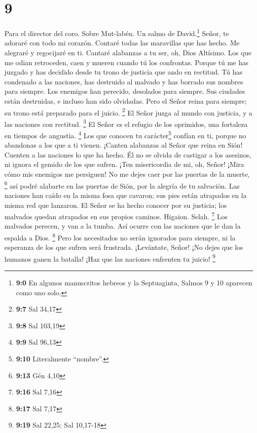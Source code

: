 \hypertarget{section-8}{%
\section{9}\label{section-8}}

Para el director del coro. Sobre Mut-labén. Un salmo de
David.\footnote{\textbf{9:0} En algunos manuscritos hebreos y la
  Septuaginta, Salmos 9 y 10 aparecen como uno solo.} 
Señor, te adoraré con todo mi corazón. Contaré todas las maravillas que
has hecho.  Me alegraré y regocijaré en ti. Cantaré
alabanzas a tu ser, oh, Dios Altísimo.  Los que me odian
retroceden, caen y mueren cuando tú los confrontas. 
Porque tú me has juzgado y has decidido desde tu trono de justicia que
ando en rectitud.  Tú has condenado a las naciones, has
destruido al malvado y has borrado sus nombres para siempre.
 Los enemigos han perecido, desolados para siempre. Sus
ciudades están destruidas, e incluso han sido olvidadas. 
Pero el Señor reina para siempre; su trono está preparado para el
juicio. \footnote{\textbf{9:7} Sal 34,17}  El Señor juzga
al mundo con justicia, y a las naciones con rectitud. \footnote{\textbf{9:8}
  Sal 103,19}  El Señor es el refugio de los oprimidos,
una fortaleza en tiempos de angustia. \footnote{\textbf{9:9} Sal 96,13}
 Los que conocen tu carácter\footnote{\textbf{9:10}
  Literalmente ``nombre''.} confían en ti, porque no abandonas a los que
a ti vienen.  ¡Canten alabanzas al Señor que reina en
Sión! Cuenten a las naciones lo que ha hecho.  Él no se
olvida de castigar a los asesinos, ni ignora el gemido de los que
sufren.  ¡Ten misericordia de mi, oh, Señor! ¡Mira cómo
mis enemigos me persiguen! No me dejes caer por las puertas de la
muerte, \footnote{\textbf{9:13} Gén 4,10}  así podré
alabarte en las puertas de Sión, por la alegría de tu salvación.
 Las naciones han caído en la misma fosa que cavaron; sus
pies están atrapados en la misma red que lanzaron.  El
Señor se ha hecho conocer por su justicia; los malvados quedan atrapados
en sus propios caminos. Higaion. Selah. \footnote{\textbf{9:16} Sal 7,16}
 Los malvados perecen, y van a la tumba. Así ocurre con
las naciones que le dan la espalda a Dios. \footnote{\textbf{9:17} Sal
  7,17}  Pero los necesitados no serán ignorados para
siempre, ni la esperanza de los que sufren será frustrada.
 ¡Levántate, Señor! ¡No dejes que los humanos ganen la
batalla! ¡Haz que las naciones enfrenten tu juicio! \footnote{\textbf{9:19}
  Sal 22,25; Sal 10,17-18}

